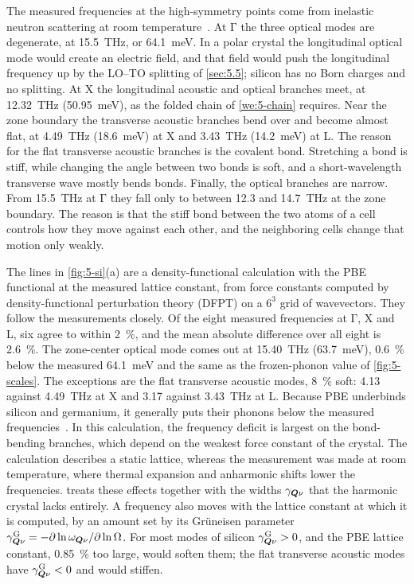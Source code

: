 The measured frequencies at the high-symmetry points come from inelastic neutron scattering at room temperature~\cite{dolling1963inelastic,nilsson1972study}. At $\mathrm{\Gamma}$ the three optical modes are degenerate, at \SI{15.5}{THz}, or \SI{64.1}{meV}. In a polar crystal the longitudinal optical mode would create an electric field, and that field would push the longitudinal frequency up by the LO--TO splitting of \cref{sec:5.5}; silicon has no Born charges and no splitting. At X the longitudinal acoustic and optical branches meet, at \SI{12.32}{THz} (\SI{50.95}{meV}), as the folded chain of \cref{we:5-chain} requires. Near the zone boundary the transverse acoustic branches bend over and become almost flat, at \SI{4.49}{THz} (\SI{18.6}{meV}) at X and \SI{3.43}{THz} (\SI{14.2}{meV}) at L. The reason for the flat transverse acoustic branches is the covalent bond. Stretching a bond is stiff, while changing the angle between two bonds is soft, and a short-wavelength transverse wave mostly bends bonds. Finally, the optical branches are narrow. From \SI{15.5}{THz} at $\mathrm{\Gamma}$ they fall only to between 12.3 and \SI{14.7}{THz} at the zone boundary. The reason is that the stiff bond between the two atoms of a cell controls how they move against each other, and the neighboring cells change that motion only weakly.

The lines in \cref{fig:5-si}(a) are a density-functional calculation with the PBE functional at the measured lattice constant, from force constants computed by density-functional perturbation theory (DFPT) on a $6^3$ grid of wavevectors. They follow the measurements closely. Of the eight measured frequencies at $\mathrm{\Gamma}$, X and L, six agree to within \SI{2}{\percent}, and the mean absolute difference over all eight is \SI{2.6}{\percent}. The zone-center optical mode comes out at \SI{15.40}{THz} (\SI{63.7}{meV}), \SI{0.6}{\percent} below the measured \SI{64.1}{meV} and the same as the frozen-phonon value of \cref{fig:5-scales}. The exceptions are the flat transverse acoustic modes, \SI{8}{\percent} soft: \num{4.13} against \SI{4.49}{THz} at X and \num{3.17} against \SI{3.43}{THz} at L. Because PBE underbinds silicon and germanium, it generally puts their phonons below the measured frequencies~\cite[Sect.~V]{haxhijaj2026lattice}. In this calculation, the frequency deficit is largest on the bond-bending branches, which depend on the weakest force constant of the crystal. The calculation describes a static lattice, whereas the measurement was made at room temperature, where thermal expansion and anharmonic shifts lower the frequencies.  treats these effects together with the widths $\gamma_{\bm{Q}\nu}$ that the harmonic crystal lacks entirely. A frequency also moves with the lattice constant at which it is computed, by an amount set by its Grüneisen parameter $\gamma^{\mathrm{G}}_{\bm{Q}\nu} = -\partial\ln\omega_{\bm{Q}\nu}/\partial\ln\Omega$. For most modes of silicon $\gamma^{\mathrm{G}}_{\bm{Q}\nu} > 0$, and the PBE lattice constant, \SI{0.85}{\percent} too large, would soften them; the flat transverse acoustic modes have $\gamma^{\mathrm{G}}_{\bm{Q}\nu} < 0$ and would stiffen.


